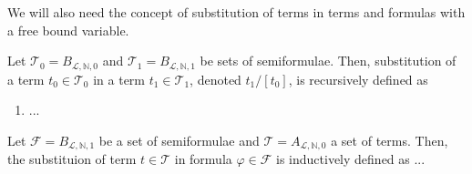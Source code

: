 We will also need the concept of substitution of terms in terms and formulas with a free bound variable.

\begin{definition}\label{def:subst-t}
    Let $\mathcal{T}_0 = B_{\mathcal{L},\mathbb{N},0}$ and $\mathcal{T}_1 = B_{\mathcal{L},\mathbb{N},1}$ be sets of semiformulae. Then, substitution of a term $t_0 \in \mathcal{T}_0$ in a term $t_1 \in \mathcal{T}_1$, denoted $t_1/[t_0]$, is recursively defined as
    \begin{enumerate}
        \item ...
    \end{enumerate}
\end{definition}

\begin{definition}[substituion]\label{def:subst}
    Let $\mathcal{F} = B_{\mathcal{L},\mathbb{N},1}$ be a set of semiformulae and $\mathcal{T} = A_{\mathcal{L},\mathbb{N},0}$ a set of terms. Then, the substituion of term $t \in \mathcal{T}$ in formula $\varphi \in \mathcal{F}$ is inductively defined as ...
\end{definition}


